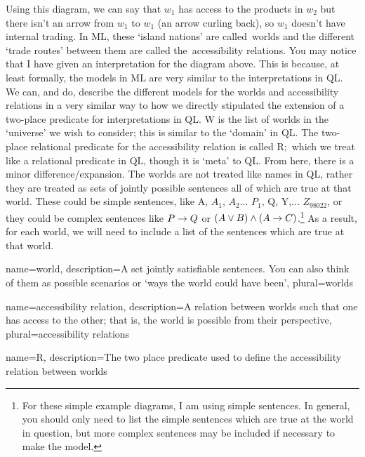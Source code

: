 Using this diagram, we can say that $w_1$ has access to the products in $w_2$ but there isn't an arrow from $w_1$ to $w_1$ (an arrow curling back), so $w_1$ doesn't have internal trading. In ML, these `island nations' are called \glspl{world} and the different `trade routes' between them are called the \glspl{accessibility relation}. You may notice that I have given an interpretation for the diagram above. This is because, at least formally, the models in ML are very similar to the interpretations in QL. We can, and do, describe the different models for the worlds and accessibility relations in a very similar way to how we directly stipulated the extension of a two-place predicate for interpretations in QL. W is the list of worlds in the `universe' we wish to consider; this is similar to the `domain' in QL. The two-place relational predicate for the accessibility relation is called \gls{R}; which we treat like a relational predicate in QL, though it is `meta' to QL. From here, there is a minor difference/expansion. The worlds are not treated like names in QL, rather they are treated as sets of jointly possible sentences all of which are true at that world. These could be simple sentences, like A, $A_1$, $A_2$... $P_1$, Q, Y,... $Z_{98022}$,  or they could be complex sentences like $P\rightarrow Q$ or $(A\vee B)\wedge(A\rightarrow C)$.\footnote{For these simple example diagrams, I am using simple sentences. In general, you should only need to list the simple sentences which are true at the world in question, but more complex sentences may be included if necessary to make the model.} As a result, for each world, we will need to include a list of the sentences which are true at that world.  

{
name=world,
description={A set jointly satisfiable sentences. You can also think of them as possible scenarios or `ways the world could have been'},
plural=worlds
}

{
name=accessibility relation,
description={A relation between \glspl{world} such that one has access to the other; that is, the world is possible from their perspective},
plural=accessibility relations
}

{
name=R,
description={The two place predicate used to define the \gls{accessibility relation} between \glspl{world}}
}


